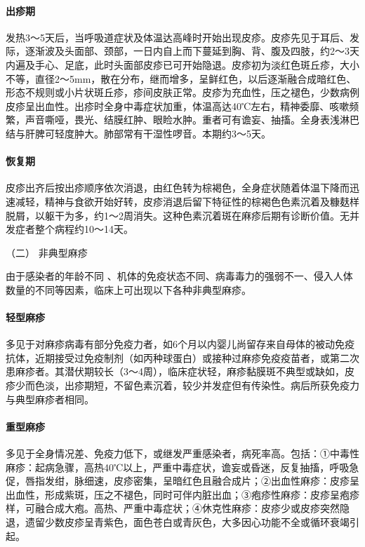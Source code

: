 \paragraph{出疹期}

发热3～5天后，当呼吸道症状及体温达高峰时开始出现皮疹。皮疹先见于耳后、发际，逐渐波及头面部、颈部，一日内自上而下蔓延到胸、背、腹及四肢，约2～3天内遍及手心、足底，此时头面部皮疹已可开始隐退。皮疹初为淡红色斑丘疹，大小不等，直径2～5mm，散在分布，继而增多，呈鲜红色，以后逐渐融合成暗红色、形态不规则或小片状斑丘疹，疹间皮肤正常。皮疹为充血性，压之褪色，少数病例皮疹呈出血性。出疹时全身中毒症状加重，体温高达40℃左右，精神委靡、咳嗽频繁，声音嘶哑，畏光、结膜红肿、眼睑水肿。重者可有谵妄、抽搐。全身表浅淋巴结与肝脾可轻度肿大。肺部常有干湿性啰音。本期约3～5天。

\paragraph{恢复期}

皮疹出齐后按出疹顺序依次消退，由红色转为棕褐色，全身症状随着体温下降而迅速减轻，精神与食欲开始好转，皮疹消退后留下特征性的棕褐色色素沉着及糠麸样脱屑，以躯干为多，约1～2周消失。这种色素沉着斑在麻疹后期有诊断价值。无并发症者整个病程约10～14天。

\hypertarget{text00217.htmlux5cux23CHP7-4-2-2-2}{}
（二） 非典型麻疹

由于感染者的年龄不同
、机体的免疫状态不同、病毒毒力的强弱不一、侵入人体数量的不同等因素，临床上可出现以下各种非典型麻疹。

\paragraph{轻型麻疹}

多见于对麻疹病毒有部分免疫力者，如6个月以内婴儿尚留存来自母体的被动免疫抗体，近期接受过免疫制剂（如丙种球蛋白）或接种过麻疹免疫疫苗者，或第二次患麻疹者。其潜伏期较长（3～4周），临床症状轻，麻疹黏膜斑不典型或缺如，皮疹少而色淡，出疹期短，不留色素沉着，较少并发症但有传染性。病后所获免疫力与典型麻疹者相同。

\paragraph{重型麻疹}

多见于全身情况差、免疫力低下，或继发严重感染者，病死率高。包括：①中毒性麻疹：起病急骤，高热40℃以上，严重中毒症状，谵妄或昏迷，反复抽搐，呼吸急促，唇指发绀，脉细速，皮疹密集，呈暗红色且融合成片；②出血性麻疹：皮疹呈出血性，形成紫斑，压之不褪色，同时可伴内脏出血；③疱疹性麻疹：皮疹呈疱疹样，可融合成大疱。高热、严重中毒症状；④休克性麻疹：皮疹少或皮疹突然隐退，遗留少数皮疹呈青紫色，面色苍白或青灰色，大多因心功能不全或循环衰竭引起。

